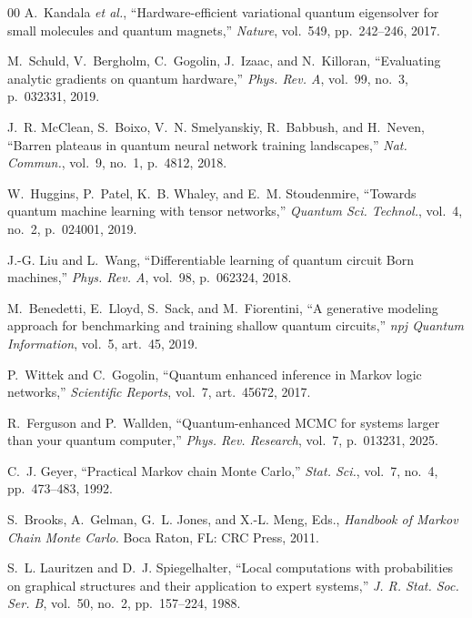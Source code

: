 \documentclass[conference,10pt]{IEEEtran}
\begin{document}
\begin{thebibliography}{00}
 A.~Kandala \emph{et al.}, ``Hardware-efficient variational quantum eigensolver for small molecules and quantum magnets,'' \emph{Nature}, vol.~549, pp.~242--246, 2017.

 M.~Schuld, V.~Bergholm, C.~Gogolin, J.~Izaac, and N.~Killoran, ``Evaluating analytic gradients on quantum hardware,'' \emph{Phys. Rev. A}, vol.~99, no.~3, p.~032331, 2019.

 J.~R. McClean, S.~Boixo, V.~N. Smelyanskiy, R.~Babbush, and H.~Neven, ``Barren plateaus in quantum neural network training landscapes,'' \emph{Nat. Commun.}, vol.~9, no.~1, p.~4812, 2018.

 W.~Huggins, P.~Patel, K.~B. Whaley, and E.~M. Stoudenmire, ``Towards quantum machine learning with tensor networks,'' \emph{Quantum Sci. Technol.}, vol.~4, no.~2, p.~024001, 2019.

 J.-G. Liu and L.~Wang, ``Differentiable learning of quantum circuit Born machines,'' \emph{Phys. Rev. A}, vol.~98, p.~062324, 2018.

 M.~Benedetti, E.~Lloyd, S.~Sack, and M.~Fiorentini, ``A generative modeling approach for benchmarking and training shallow quantum circuits,'' \emph{npj Quantum Information}, vol.~5, art.~45, 2019.

 P.~Wittek and C.~Gogolin, ``Quantum enhanced inference in Markov logic networks,'' \emph{Scientific Reports}, vol.~7, art.~45672, 2017.

 R.~Ferguson and P.~Wallden, ``Quantum-enhanced MCMC for systems larger than your quantum computer,'' \emph{Phys. Rev. Research}, vol.~7, p.~013231, 2025.

 C.~J. Geyer, ``Practical Markov chain Monte Carlo,'' \emph{Stat. Sci.}, vol.~7, no.~4, pp.~473--483, 1992.

 S.~Brooks, A.~Gelman, G.~L. Jones, and X.-L. Meng, Eds., \emph{Handbook of Markov Chain Monte Carlo}. Boca Raton, FL: CRC Press, 2011.

 S.~L. Lauritzen and D.~J. Spiegelhalter, ``Local computations with probabilities on graphical structures and their application to expert systems,'' \emph{J. R. Stat. Soc. Ser. B}, vol.~50, no.~2, pp.~157--224, 1988.

\end{thebibliography}
\end{document}
